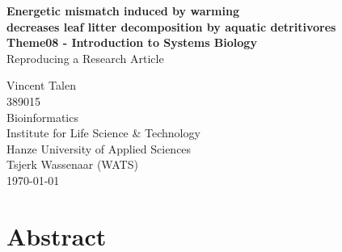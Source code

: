 \newpage
\begin{center}
  \topskip=45pt
  \LARGE{\textbf{Energetic mismatch induced by warming\\decreases leaf litter decomposition by aquatic detritivores}}\\
  \vspace*{20pt}
  \large{\textbf{Theme08 - Introduction to Systems Biology}}\\
  \large{Reproducing a Research Article}\\
\end{center}
\vspace*{\fill}
\begin{flushright}
  Vincent Talen\\
  389015\\
  Bioinformatics\\
  Institute for Life Science \& Technology\\
  Hanze University of Applied Sciences\\
  Tsjerk Wassenaar (WATS)\\
  \today\\
\end{flushright}


\newpage
{}
\section*{Abstract}



\newpage
\setcounter{tocdepth}{3}
\setcounter{secnumdepth}{2}
\renewcommand{\contentsname}{Table of Contents}
\tableofcontents


\newpage

\listoffigures 
\listoftables


\newpage
